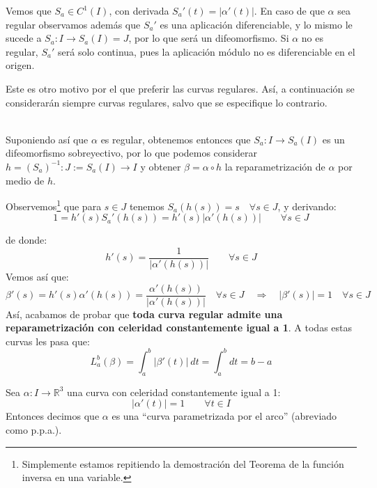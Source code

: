 \begin{observacion}
    Vemos que $S_a\in C^1(I)$, con derivada $S_a'(t) = |\alpha'(t)|$. En caso de que $\alpha$ sea regular observamos además que $S_a'$ es una aplicación diferenciable, y lo mismo le sucede a $S_a:I\to S_a(I)=J$, por lo que será un difeomorfismo. Si $\alpha$ no es regular, $S_a'$ será solo continua, pues la aplicación módulo no es diferenciable en el origen.

    \noindent
    Este es otro motivo por el que preferir las curvas regulares. Así, a continuación se considerarán siempre curvas regulares, salvo que se especifique lo contrario.
\end{observacion}~\\

\noindent
Suponiendo así que $\alpha$ es regular, obtenemos entonces que $S_a:I\to S_a(I)$ es un difeomorfismo sobreyectivo, por lo que podemos considerar $h={(S_a)}^{-1}:J:=S_a(I)\to I$ y obtener $\beta = \alpha\circ h$ la reparametrización de $\alpha$ por medio de $h$.

Observemos\footnote{Simplemente estamos repitiendo la demostración del Teorema de la función inversa en una variable.} que para $s\in J$ tenemos $S_a(h(s)) = s\quad \forall s\in J$, y derivando:
\begin{equation*}
    1 = h'(s)S_a'(h(s)) = h'(s)|\alpha'(h(s))| \qquad \forall s\in J
\end{equation*}

de donde:
\begin{equation*}
    h'(s) = \frac{1}{|\alpha'(h(s))|} \qquad \forall s\in J
\end{equation*}
Vemos así que:
\begin{equation*}
    \beta'(s) = h'(s)\alpha'(h(s)) = \frac{\alpha'(h(s))}{|\alpha'(h(s))|} \quad \forall s\in J \quad\Longrightarrow\quad |\beta'(s)| = 1 \quad \forall s\in J
\end{equation*}
Así, acabamos de probar que \textbf{toda curva regular admite una reparametrización con celeridad constantemente igual a 1}. A todas estas curvas les pasa que:
\begin{equation*}
    L_a^b(\beta) = \int_{a}^{b} |\beta'(t)|~dt  = \int_{a}^{b}dt  = b-a
\end{equation*}

\begin{definicion}
    Sea $\alpha:I\to \mathbb{R}^3$ una curva con celeridad constantemente igual a 1:
    \begin{equation*}
        |\alpha'(t)| = 1 \qquad \forall t\in I
    \end{equation*}
    Entonces decimos que $\alpha$ es una ``curva parametrizada por el arco'' (abreviado como p.p.a.).
\end{definicion}

